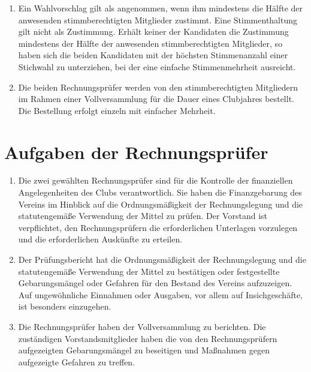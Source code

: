 \documentclass{article}
\begin{document}
\begin{enumerate}
    \item Ein Wahlvorschlag gilt als angenommen, wenn ihm mindestens die Hälfte der anwesenden stimmberechtigten Mitglieder zustimmt. Eine Stimmenthaltung gilt nicht als Zustimmung. Erhält keiner der Kandidaten die Zustimmung mindestens der Hälfte der anwesenden stimmberechtigten Mitglieder, so haben sich die beiden Kandidaten mit der höchsten Stimmenanzahl einer Stichwahl zu unterziehen, bei der eine einfache Stimmenmehrheit ausreicht.
    \item Die beiden Rechnungsprüfer werden von den stimmberechtigten Mitgliedern im Rahmen einer Vollversammlung für die Dauer eines Clubjahres bestellt. Die Bestellung erfolgt einzeln mit einfacher Mehrheit.
\end{enumerate}

\section{Aufgaben der Rechnungsprüfer}
\begin{enumerate}
    \item Die zwei gewählten Rechnungsprüfer sind für die Kontrolle der finanziellen Angelegenheiten des Clubs verantwortlich. Sie haben die Finanzgebarung des Vereins im Hinblick auf die Ordnungsmäßigkeit der Rechnungslegung und die statutengemäße Verwendung der Mittel zu prüfen. Der Vorstand ist verpflichtet, den Rechnungsprüfern die erforderlichen Unterlagen vorzulegen und die erforderlichen Auskünfte zu erteilen.
    \item Der Prüfungsbericht hat die Ordnungsmäßigkeit der Rechnungslegung und die statutengemäße Verwendung der Mittel zu bestätigen oder festgestellte Gebarungsmängel oder Gefahren für den Bestand des Vereins aufzuzeigen. Auf ungewöhnliche Einnahmen oder Ausgaben, vor allem auf Insichgeschäfte, ist besonders einzugehen.
    \item Die Rechnungsprüfer haben der Vollversammlung zu berichten. Die zuständigen Vorstandsmitglieder haben die von den Rechnungsprüfern aufgezeigten Gebarungsmängel zu beseitigen und Maßnahmen gegen aufgezeigte Gefahren zu treffen.
\end{enumerate}
\end{document}
